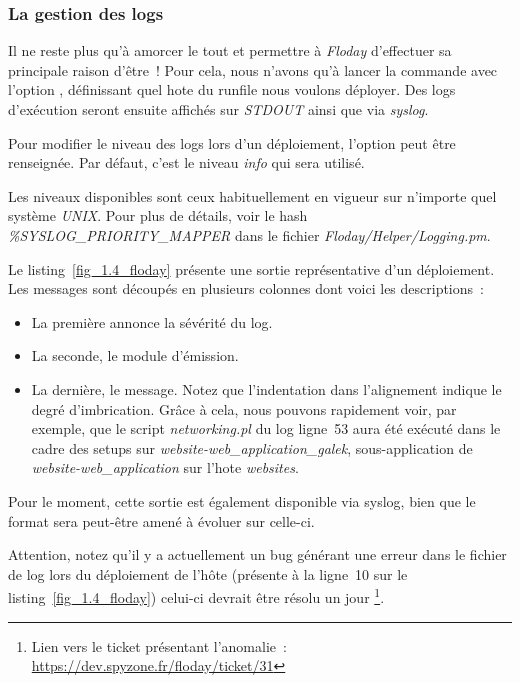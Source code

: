 \subsubsection{La gestion des logs}

Il ne reste plus qu'à amorcer le tout et permettre à \emph{Floday} d'effectuer sa principale raison d'être~!
Pour cela, nous n'avons qu'à lancer la commande  avec l'option , définissant quel \gls{hote} du runfile nous voulons déployer.
Des logs d'exécution seront ensuite affichés sur \emph{STDOUT} ainsi que via \emph{syslog}.

Pour modifier le niveau des logs lors d'un déploiement, l'option  peut être renseignée.
Par défaut, c'est le niveau \emph{info} qui sera utilisé.

Les niveaux disponibles sont ceux habituellement en vigueur sur n'importe quel système \emph{UNIX}.
Pour plus de détails, voir le hash \emph{\%SYSLOG\_PRIORITY\_MAPPER} dans le fichier \emph{Floday/Helper/Logging.pm}.



Le listing~\ref{fig_1.4_floday} présente une sortie représentative d'un déploiement.
Les messages sont découpés en plusieurs colonnes dont voici les descriptions~:
\begin{itemize}
	\item La première annonce la sévérité du log.
	\item La seconde, le module d'émission.
	\item La dernière, le message. Notez que l'indentation dans l'alignement indique le degré d'imbrication. Grâce à cela, nous pouvons rapidement voir, par exemple, que le script \emph{networking.pl} du log ligne~53 aura été exécuté dans le cadre des setups sur \emph{website-web\_application\_galek}, sous-application de \emph{website-web\_application} sur l'\gls{hote} \emph{websites}.
\end{itemize}

Pour le moment, cette sortie est également disponible via syslog, bien que le format sera peut-être amené à évoluer sur celle-ci.

Attention, notez qu'il y a actuellement un bug générant une erreur dans le fichier de log lors du déploiement de l'hôte (présente à la ligne~10 sur le listing~\ref{fig_1.4_floday}) celui-ci devrait être résolu un jour%
\footnote{Lien vers le ticket présentant l'anomalie~: \url{https://dev.spyzone.fr/floday/ticket/31}}.
